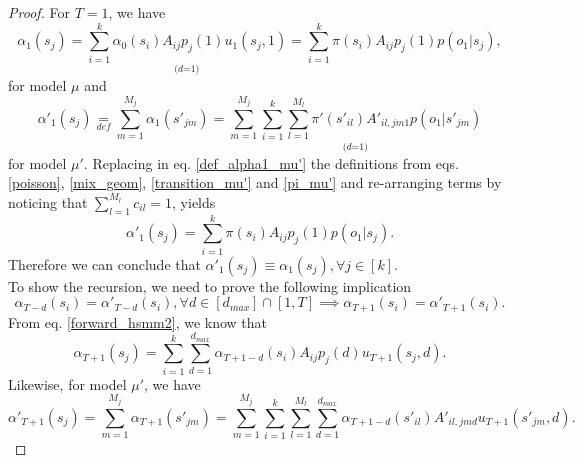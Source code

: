 \documentclass[extendedabs]{recpad2k}
\begin{document}
\begin{proof}
For $T=1$, we have
\begin{equation}
    \alpha_1(s_j)= \underset{\textit{(d=1)}}{\sum_{i=1}^k\alpha_0(s_i)A_{ij}p_j(1)u_1(s_j,1)} = \sum_{i=1}^k \pi(s_i)A_{ij}p_j(1)p(o_1|s_j),
\end{equation}
for model $\mu$ and
\begin{equation}
    \alpha'_1(s_j) \underset{def}{=} \sum_{m=1}^{M_j} \alpha_1(s'_{jm}) = \underset{\textit{(d=1)}}{\sum_{m=1}^{M_j} \sum_{i=1}^k \sum_{l=1}^{M_l} \pi'(s'_{il}) A'_{il,jm1} p(o_1|s'_{jm})}
    \label{def_alpha1_mu'}
\end{equation}
for model $\mu'$. 
Replacing in eq. \eqref{def_alpha1_mu'} the definitions from eqs. \eqref{poisson}, \eqref{mix_geom}, \eqref{transition_mu'} and \eqref{pi_mu'} and
re-arranging terms by noticing that $\sum_{l=1}^{M_l} c_{il}=1$, yields
\begin{equation}
\alpha'_1(s_j) %
=\sum_{i=1}^k \pi(s_i)A_{ij}p_j(1)p(o_1|s_j).
\end{equation}
Therefore we can conclude that $\alpha'_1(s_j) \equiv \alpha_1(s_j), \forall j \in [k]$. \\ \noindent
To show the recursion, we need to prove the following implication
\begin{equation}
    \alpha_{T-d}(s_i)=\alpha'_{T-d}(s_i), \forall{d \in [d_{max}] \cap [1,T]} \implies \alpha_{T+1}(s_i) = \alpha'_{T+1}(s_i).
    \label{implication}
\end{equation}
From eq. \eqref{forward_hsmm2}, we know that
\begin{equation}
    \alpha_{T+1}(s_j) = \sum_{i=1}^k \sum_{d=1}^{d_{max}} \alpha_{T+1-d}(s_i)A_{ij}p_j(d)u_{T+1}(s_j,d).
    \label{alpha_T+1_mu}
\end{equation}
Likewise, for model $\mu'$, we have
\begin{equation}
    \alpha'_{T+1}(s_j)=\sum_{m=1}^{M_j} \alpha_{T+1}(s'_{jm}) = \sum_{m=1}^{M_j} \sum_{i=1}^k \sum_{l=1}^{M_l} \sum_{d=1}^{d_{max}} \alpha_{T+1-d}(s'_{il}) A'_{il,jmd}u_{T+1}(s'_{jm},d).
    \label{alpha_T+1_mu'_1}
\end{equation}

\end{proof}
\end{document}
